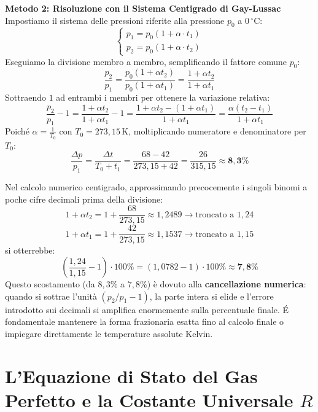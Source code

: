 \documentclass[11pt,a4paper,oneside]{report}
\begin{document}
\begin{problema}
\textbf{Metodo 2: Risoluzione con il Sistema Centigrado di Gay-Lussac}\\
Impostiamo il sistema delle pressioni riferite alla pressione $p_0$ a $0\,^\circ\text{C}$:
\[
\begin{cases}
p_1 = p_0 (1 + \alpha \cdot t_1) \\
p_2 = p_0 (1 + \alpha \cdot t_2)
\end{cases}
\]
Eseguiamo la divisione membro a membro, semplificando il fattore comune $p_0$:
\[
\frac{p_2}{p_1} = \frac{p_0 (1 + \alpha t_2)}{p_0 (1 + \alpha t_1)} = \frac{1 + \alpha t_2}{1 + \alpha t_1}
\]
Sottraendo $1$ ad entrambi i membri per ottenere la variazione relativa:
\[
\frac{p_2}{p_1} - 1 = \frac{1 + \alpha t_2}{1 + \alpha t_1} - 1 = \frac{1 + \alpha t_2 - (1 + \alpha t_1)}{1 + \alpha t_1} = \frac{\alpha (t_2 - t_1)}{1 + \alpha t_1}
\]
Poich\'e $\alpha = \frac{1}{T_0}$ con $T_0 = 273{,}15\,\text{K}$, moltiplicando numeratore e denominatore per $T_0$:
\[
\frac{\Delta p}{p_1} = \frac{\Delta t}{T_0 + t_1} = \frac{68 - 42}{273{,}15 + 42} = \frac{26}{315{,}15} \approx \mathbf{8{,}3\%}
\]

\begin{avviso}
Nel calcolo numerico centigrado, approssimando precocemente i singoli binomi a poche cifre decimali prima della divisione:
\[
1 + \alpha t_2 = 1 + \frac{68}{273{,}15} \approx 1{,}2489 \longrightarrow \text{troncato a } 1{,}24
\]
\[
1 + \alpha t_1 = 1 + \frac{42}{273{,}15} \approx 1{,}1537 \longrightarrow \text{troncato a } 1{,}15
\]
si otterrebbe:
\[
\left(\frac{1{,}24}{1{,}15} - 1\right) \cdot 100\% = (1{,}0782 - 1) \cdot 100\% \approx \mathbf{7{,}8\%}
\]
Questo scostamento (da $8{,}3\%$ a $7{,}8\%$) \`e dovuto alla \textbf{cancellazione numerica}: quando si sottrae l'unit\`a $(p_2/p_1 - 1)$, la parte intera si elide e l'errore introdotto sui decimali si amplifica enormemente sulla percentuale finale. \'E fondamentale mantenere la forma frazionaria esatta fino al calcolo finale o impiegare direttamente le temperature assolute Kelvin.
\end{avviso}
\end{problema}


\chapter{L'Equazione di Stato del Gas Perfetto e la Costante Universale $R$}
\end{document}
